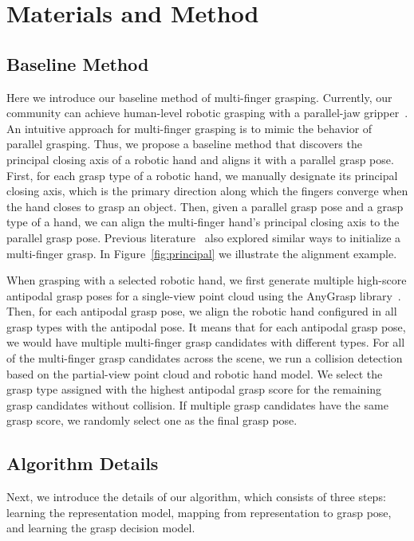 
\section{Materials and Method}


\subsection{Baseline Method}
Here we introduce our baseline method of multi-finger grasping. Currently, our community can achieve human-level robotic grasping with a parallel-jaw gripper~\cite{fang2023anygrasp}. An intuitive approach for multi-finger grasping is to mimic the behavior of parallel grasping. Thus, we propose a baseline method that discovers the principal closing axis of a robotic hand and aligns it with a parallel grasp pose. First, for each grasp type of a robotic hand, we manually designate its principal closing axis, which is the primary direction along which the fingers converge when the hand closes to grasp an object. Then, given a parallel grasp pose and a grasp type of a hand, we can align the multi-finger hand's principal closing axis to the parallel grasp pose. Previous literature~\cite{fan2019optimization,fan2018real} also explored similar ways to initialize a multi-finger grasp. In Figure~\ref{fig:principal} we illustrate the alignment example. 

When grasping with a selected robotic hand, we first generate multiple high-score antipodal grasp poses for a single-view point cloud using the AnyGrasp library~\cite{fang2023anygrasp}. Then, for each antipodal grasp pose, we align the robotic hand configured in all grasp types with the antipodal pose. It means that for each antipodal grasp pose, we would have multiple multi-finger grasp candidates with different types. For all of the multi-finger grasp candidates across the scene, we run a collision detection based on the partial-view point cloud and robotic hand model. We select the grasp type assigned with the highest antipodal grasp score for the remaining grasp candidates without collision. If multiple grasp candidates have the same grasp score, we randomly select one as the final grasp pose.
 
\subsection{Algorithm Details}
Next, we introduce the details of our algorithm, which consists of three steps: learning the representation model, mapping from representation to grasp pose, and learning the grasp decision model.
